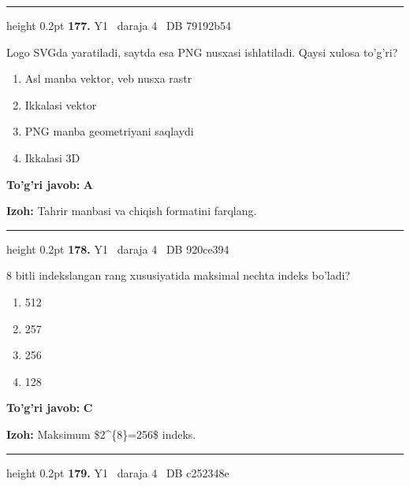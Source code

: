 \documentclass[10pt,a4paper,oneside]{article}
\begin{document}
\vspace{2mm}\hrule height 0.2pt \vspace{4mm}
\hypertarget{q177}{\textbf{\color{ink}177.}}  {\color{muted}\scriptsize Y1 \textbullet\ daraja 4 \textbullet\ DB 79192b54}
\par
Logo SVGda yaratiladi, saytda esa PNG nusxasi ishlatiladi. Qaysi xulosa to'g'ri?
\begin{enumerate}[label=\Alph*),leftmargin=9mm]
\item Asl manba vektor, veb nusxa rastr
\item Ikkalasi vektor
\item PNG manba geometriyani saqlaydi
\item Ikkalasi 3D
\end{enumerate}
\begin{tcolorbox}[enhanced,breakable,colback=teal!4,colframe=teal!45!black,boxrule=0.45pt,arc=1.2mm,left=2.8mm,right=2.8mm,top=2mm,bottom=2mm,before skip=2mm,after skip=2mm]
\textbf{\color{teal}To'g'ri javob:} \textbf{A}
\par\smallskip
\textbf{Izoh:} Tahrir manbasi va chiqish formatini farqlang.
\end{tcolorbox}
\vspace{2mm}\hrule height 0.2pt \vspace{4mm}
\hypertarget{q178}{\textbf{\color{ink}178.}}  {\color{muted}\scriptsize Y1 \textbullet\ daraja 4 \textbullet\ DB 920ce394}
\par
8 bitli indekslangan rang xususiyatida maksimal nechta indeks bo'ladi?
\begin{enumerate}[label=\Alph*),leftmargin=9mm]
\item 512
\item 257
\item 256
\item 128
\end{enumerate}
\begin{tcolorbox}[enhanced,breakable,colback=teal!4,colframe=teal!45!black,boxrule=0.45pt,arc=1.2mm,left=2.8mm,right=2.8mm,top=2mm,bottom=2mm,before skip=2mm,after skip=2mm]
\textbf{\color{teal}To'g'ri javob:} \textbf{C}
\par\smallskip
\textbf{Izoh:} Maksimum \$2\textasciicircum{}\{8\}=256\$ indeks.
\end{tcolorbox}
\vspace{2mm}\hrule height 0.2pt \vspace{4mm}
\hypertarget{q179}{\textbf{\color{ink}179.}}  {\color{muted}\scriptsize Y1 \textbullet\ daraja 4 \textbullet\ DB c252348e}
\end{document}

